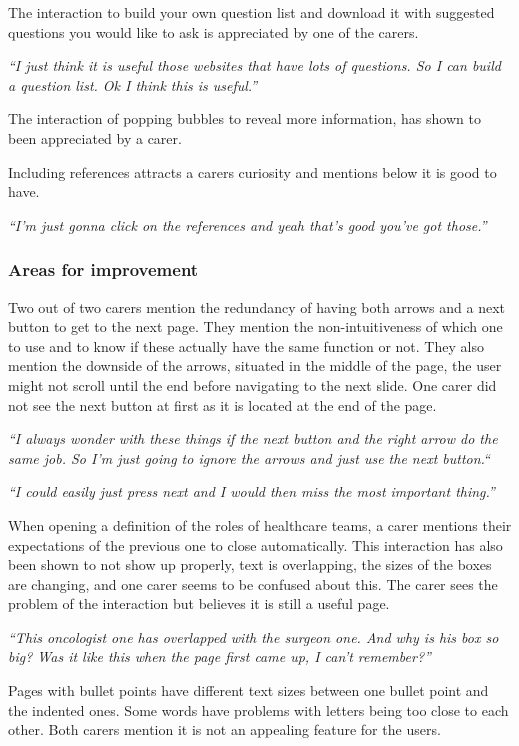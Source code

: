 \documentclass{sigchi}
\begin{document}
The interaction to build your own question list and download it with suggested questions you would like to ask is appreciated by one of the carers. 

\textit{“I just think it is useful those websites that have lots of questions. So I can build a question list. Ok I think this is useful.”} 

The interaction of popping bubbles to reveal more information, has shown to been appreciated by a carer.

Including references attracts a carers curiosity and mentions below it is good to have.

\textit{“I’m just gonna click on the references and yeah that’s good you’ve got those.”}

\subsubsection{Areas for improvement}
Two out of two carers mention the redundancy of having both arrows and a next button to get to the next page. They mention the non-intuitiveness of which one to use and to know if these actually have the same function or not. They also mention the downside of the arrows, situated in the middle of the page, the user might not scroll until the end before navigating to the next slide. One carer did not see the next button at first as it is located at the end of the page.

\textit{“I always wonder with these things if the next button and the right arrow do the same job. So I’m just going to ignore the arrows and just use the next button.“}

\textit{“I could easily just press next and I would then miss the most important thing.”}

When opening a definition of the roles of healthcare teams, a carer mentions their expectations of the previous one to close automatically. This interaction has also been shown to not show up properly, text is overlapping, the sizes of the boxes are changing, and one carer seems to be confused about this. The carer sees the problem of the interaction but believes it is still a useful page.

\textit{“This oncologist one has overlapped with the surgeon one. And why is his box so big? Was it like this when the page first came up, I can’t remember?”}

Pages with bullet points have different text sizes between one bullet point and the indented ones. Some words have problems with letters being too close to each other. Both carers mention it is not an appealing feature for the users.
\end{document}
